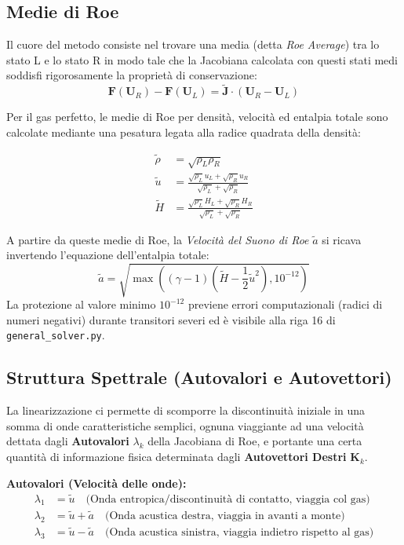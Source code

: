 \documentclass[11pt,a4paper]{article}
\begin{document}
\subsection{Medie di Roe}
Il cuore del metodo consiste nel trovare una media (detta \textit{Roe Average}) tra lo stato L e lo stato R in modo tale che la Jacobiana calcolata con questi stati medi soddisfi rigorosamente la proprietà di conservazione:
\begin{equation}
\mathbf{F}(\mathbf{U}_R) - \mathbf{F}(\mathbf{U}_L) = \tilde{\mathbf{J}} \cdot (\mathbf{U}_R - \mathbf{U}_L)
\end{equation}

Per il gas perfetto, le medie di Roe per densità, velocità ed entalpia totale sono calcolate mediante una pesatura legata alla radice quadrata della densità:

\begin{align}
\tilde{\rho} &= \sqrt{\rho_L \rho_R} \\
\tilde{u} &= \frac{\sqrt{\rho_L} u_L + \sqrt{\rho_R} u_R}{\sqrt{\rho_L} + \sqrt{\rho_R}} \\
\tilde{H} &= \frac{\sqrt{\rho_L} H_L + \sqrt{\rho_R} H_R}{\sqrt{\rho_L} + \sqrt{\rho_R}}
\end{align}

A partire da queste medie di Roe, la \textit{Velocità del Suono di Roe} $\tilde{a}$ si ricava invertendo l'equazione dell'entalpia totale:
\begin{equation}
\tilde{a} = \sqrt{ \max\left( (\gamma - 1) \left( \tilde{H} - \frac{1}{2}\tilde{u}^2 \right), 10^{-12} \right) }
\end{equation}
La protezione al valore minimo $10^{-12}$ previene errori computazionali (radici di numeri negativi) durante transitori severi ed è visibile alla riga 16 di \texttt{general\_solver.py}.

\subsection{Struttura Spettrale (Autovalori e Autovettori)}
La linearizzazione ci permette di scomporre la discontinuità iniziale in una somma di onde caratteristiche semplici, ognuna viaggiante ad una velocità dettata dagli \textbf{Autovalori} $\lambda_k$ della Jacobiana di Roe, e portante una certa quantità di informazione fisica determinata dagli \textbf{Autovettori Destri} $\mathbf{K}_k$.

\textbf{Autovalori (Velocità delle onde):}
\begin{align}
\lambda_1 &= \tilde{u} \quad \text{(Onda entropica/discontinuità di contatto, viaggia col gas)} \\
\lambda_2 &= \tilde{u} + \tilde{a} \quad \text{(Onda acustica destra, viaggia in avanti a monte)} \\
\lambda_3 &= \tilde{u} - \tilde{a} \quad \text{(Onda acustica sinistra, viaggia indietro rispetto al gas)}
\end{align}
\end{document}
